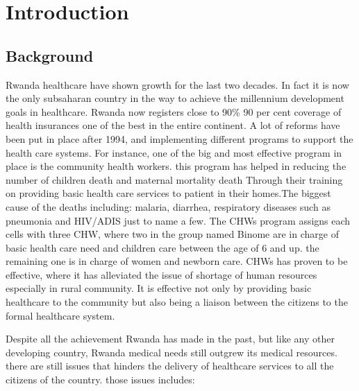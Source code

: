 \chapter{Introduction}

\section{Background}

Rwanda healthcare have shown growth for the last two decades. In fact it is now the only subsaharan country in the way to achieve the millennium development goals in healthcare\cite{farmer2013reduced}. Rwanda now registers close to 90\% 90 per cent coverage of health insurances one of the best in the entire continent\cite{twahirwa2008sharing}. A lot of  reforms have been put in place after 1994, and implementing different programs to support the health care systems. For instance, one of the big and most effective program in place is the community health workers. this program has helped in reducing the number of children death and maternal mortality death Through their training on providing basic health care services to patient in their homes\cite{theunitednationschildrensemergencyfundunicef2013}.The biggest cause of the deaths including: malaria, diarrhea, respiratory diseases such as pneumonia and HIV/ADIS just to name a few\cite{chen2004human}. The CHWs program assigns each cells with three CHW, where two in the group named Binome are in charge of basic health care need and children care between the age of 6 and up. the remaining one is in charge of women and newborn care. CHWs has proven to be effective, where it has alleviated the issue of shortage of human resources especially in rural community\cite{condo2014rwanda}. It is effective not only by providing basic healthcare to the community but also being a liaison between the citizens to the formal healthcare system.

Despite all the achievement Rwanda has made in the past, but like any other developing country, Rwanda medical needs still outgrew its medical resources. there are still issues that hinders the delivery of healthcare services to all the citizens of the country. those issues includes:

